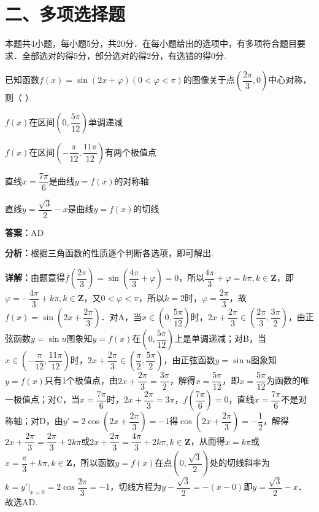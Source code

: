 \section*{二、多项选择题}
本题共4小题，每小题5分，共20分．在每小题给出的选项中，有多项符合题目要求．全部选对的得5分，部分选对的得2分，有选错的得0分.

\begin{question}[points=5]
已知函数$f(x)=\sin(2x+\varphi)(0<\varphi<\pi)$的图像关于点$\left(\dfrac{2\pi}{3},0\right)$中心对称，则（ ）
\begin{choices}
  \item $f(x)$在区间$\left(0,\dfrac{5\pi}{12}\right)$单调递减
  \item $f(x)$在区间$\left(-\dfrac{\pi}{12},\dfrac{11\pi}{12}\right)$有两个极值点
  \item 直线$x=\dfrac{7\pi}{6}$是曲线$y=f(x)$的对称轴
  \item 直线$y=\dfrac{\sqrt{3}}{2}-x$是曲线$y=f(x)$的切线
\end{choices}
\begin{solution}
\textbf{答案：}AD

\textbf{分析：}根据三角函数的性质逐个判断各选项，即可解出.

\textbf{详解：}由题意得$f\left(\dfrac{2\pi}{3}\right)=\sin\left(\dfrac{4\pi}{3}+\varphi\right)=0$，所以$\dfrac{4\pi}{3}+\varphi=k\pi,k\in\mathbf{Z}$，即$\varphi=-\dfrac{4\pi}{3}+k\pi,k\in\mathbf{Z}$，又$0<\varphi<\pi$，所以$k=2$时，$\varphi=\dfrac{2\pi}{3}$，故$f(x)=\sin\left(2x+\dfrac{2\pi}{3}\right)$．对A，当$x\in\left(0,\dfrac{5\pi}{12}\right)$时，$2x+\dfrac{2\pi}{3}\in\left(\dfrac{2\pi}{3},\dfrac{3\pi}{2}\right)$，由正弦函数$y=\sin u$图象知$y=f(x)$在$\left(0,\dfrac{5\pi}{12}\right)$上是单调递减；对B，当$x\in\left(-\dfrac{\pi}{12},\dfrac{11\pi}{12}\right)$时，$2x+\dfrac{2\pi}{3}\in\left(\dfrac{\pi}{2},\dfrac{5\pi}{2}\right)$，由正弦函数$y=\sin u$图象知$y=f(x)$只有1个极值点，由$2x+\dfrac{2\pi}{3}=\dfrac{3\pi}{2}$，解得$x=\dfrac{5\pi}{12}$，即$x=\dfrac{5\pi}{12}$为函数的唯一极值点；对C，当$x=\dfrac{7\pi}{6}$时，$2x+\dfrac{2\pi}{3}=3\pi$，$f\left(\dfrac{7\pi}{6}\right)=0$，直线$x=\dfrac{7\pi}{6}$不是对称轴；对D，由$y'=2\cos\left(2x+\dfrac{2\pi}{3}\right)=-1$得$\cos\left(2x+\dfrac{2\pi}{3}\right)=-\dfrac{1}{2}$，解得$2x+\dfrac{2\pi}{3}=\dfrac{2\pi}{3}+2k\pi$或$2x+\dfrac{2\pi}{3}=\dfrac{4\pi}{3}+2k\pi,k\in\mathbf{Z}$，从而得$x=k\pi$或$x=\dfrac{\pi}{3}+k\pi,k\in\mathbf{Z}$，所以函数$y=f(x)$在点$\left(0,\dfrac{\sqrt{3}}{2}\right)$处的切线斜率为$k=y'|_{x=0}=2\cos\dfrac{2\pi}{3}=-1$，切线方程为$y-\dfrac{\sqrt{3}}{2}=-(x-0)$即$y=\dfrac{\sqrt{3}}{2}-x$．故选AD.
\end{solution}
\end{question}

